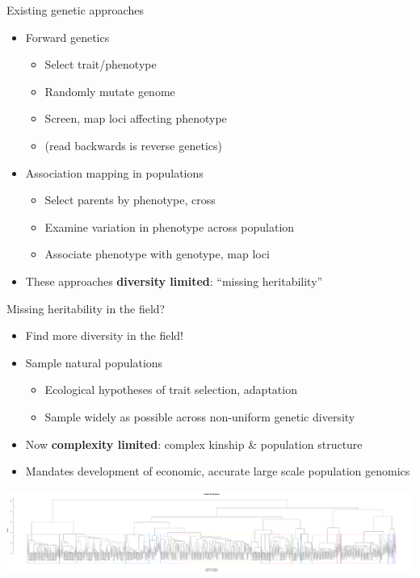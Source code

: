 \documentclass[t]{beamer}
\begin{document}
\begin{frame}{Existing genetic approaches}
  \begin{itemize}
    \item Forward genetics
      \begin{itemize}
        \item Select trait/phenotype
        \item Randomly mutate genome
        \item Screen, map loci affecting phenotype
        \item (read backwards is reverse genetics)
      \end{itemize}
    \item Association mapping in populations
      \begin{itemize}
        \item Select parents by phenotype, cross
        \item Examine variation in phenotype across population
        \item Associate phenotype with genotype, map loci
      \end{itemize}
    \pause
  \item These approaches \textbf{diversity limited}: ``missing heritability''
  \end{itemize}
\end{frame}


\begin{frame}{Missing heritability in the field?}
  \begin{itemize}
    \item Find more diversity in the field!
    \item Sample natural populations
      \begin{itemize}
        \item Ecological hypotheses of trait selection, adaptation
        \item Sample widely as possible across non-uniform genetic diversity
      \end{itemize}
      \pause
    \item Now \textbf{complexity limited}: complex kinship \& population
      structure
    \item Mandates development of economic, accurate large scale population
      genomics
  \end{itemize}
  \begin{center}
    \includegraphics[width=\textwidth]{img/jared-tree.pdf}
  \end{center}
\end{frame}
\end{document}
